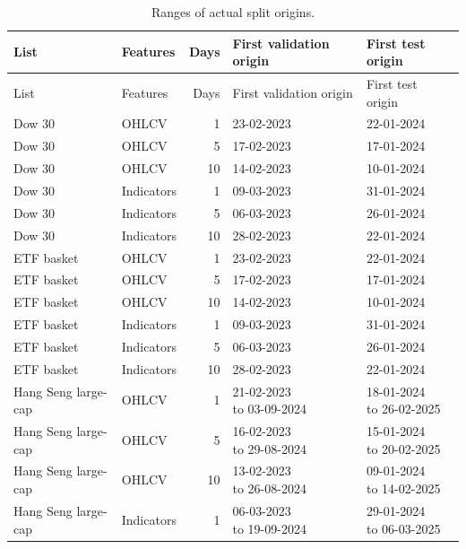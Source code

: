 \begingroup\small
\setlength{\tabcolsep}{4pt}
\begin{longtable}{llrl l}
\caption{Ranges of actual split origins.}\label{tab:split_ranges}\\
\toprule
List & Features & Days & First validation origin & First test origin \\
\midrule
\endfirsthead
\toprule
List & Features & Days & First validation origin & First test origin \\
\midrule
\endhead
\bottomrule\endfoot
Dow 30 & OHLCV & 1 & 23-02-2023 & 22-01-2024 \\
Dow 30 & OHLCV & 5 & 17-02-2023 & 17-01-2024 \\
Dow 30 & OHLCV & 10 & 14-02-2023 & 10-01-2024 \\
Dow 30 & Indicators & 1 & 09-03-2023 & 31-01-2024 \\
Dow 30 & Indicators & 5 & 06-03-2023 & 26-01-2024 \\
Dow 30 & Indicators & 10 & 28-02-2023 & 22-01-2024 \\
ETF basket & OHLCV & 1 & 23-02-2023 & 22-01-2024 \\
ETF basket & OHLCV & 5 & 17-02-2023 & 17-01-2024 \\
ETF basket & OHLCV & 10 & 14-02-2023 & 10-01-2024 \\
ETF basket & Indicators & 1 & 09-03-2023 & 31-01-2024 \\
ETF basket & Indicators & 5 & 06-03-2023 & 26-01-2024 \\
ETF basket & Indicators & 10 & 28-02-2023 & 22-01-2024 \\
Hang Seng large-cap & OHLCV & 1 & \shortstack[l]{21-02-2023\\to 03-09-2024} & \shortstack[l]{18-01-2024\\to 26-02-2025} \\
Hang Seng large-cap & OHLCV & 5 & \shortstack[l]{16-02-2023\\to 29-08-2024} & \shortstack[l]{15-01-2024\\to 20-02-2025} \\
Hang Seng large-cap & OHLCV & 10 & \shortstack[l]{13-02-2023\\to 26-08-2024} & \shortstack[l]{09-01-2024\\to 14-02-2025} \\
Hang Seng large-cap & Indicators & 1 & \shortstack[l]{06-03-2023\\to 19-09-2024} & \shortstack[l]{29-01-2024\\to 06-03-2025} \\

\end{longtable}
